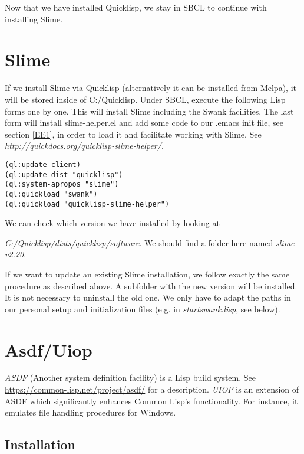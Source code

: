 \documentclass[../Maxima_Workbook.tex]{subfiles}
\begin{document}
Now that we have installed Quicklisp, we stay in SBCL to continue with installing Slime.

\section{Slime}

If we install Slime via Quicklisp (alternatively it can be installed from Melpa), it will be stored inside of C:/Quicklisp. Under SBCL, execute the following Lisp forms one by one. This will install Slime including the Swank facilities. The last form will install slime-helper.el and add some code to our .emacs init file, see section \ref{EE1}, in order to load it and facilitate working with Slime. See \emph{http://quickdocs.org/quicklisp-slime-helper/}. 

\begin{lstlisting}[style=lisp]
(ql:update-client)
(ql:update-dist "quicklisp")
(ql:system-apropos "slime")
(ql:quickload "swank")
(ql:quickload "quicklisp-slime-helper")
\end{lstlisting}

We can check which version we have installed by looking at

\emph{C:/Quicklisp/dists/quicklisp/software}. We should find a folder here named \emph{slime-v2.20}.

\lz If we want to update an existing Slime installation, we follow exactly the same procedure as described above. A subfolder with the new version will be installed. It is not necessary to uninstall the old one. We only have to adapt the paths in our personal setup and initialization files (e.g. in \emph{startswank.lisp}, see below).

\section{Asdf/Uiop}

\lz \emph{ASDF} (Another system definition facility) is a Lisp build system. See \href{https://common-lisp.net/project/asdf/}{https://common-lisp.net/project/asdf/} for a description. \emph{UIOP} is an extension of ASDF which significantly enhances Common Lisp's functionality. For instance, it emulates file handling procedures for Windows.

\subsection{Installation}
\end{document}
